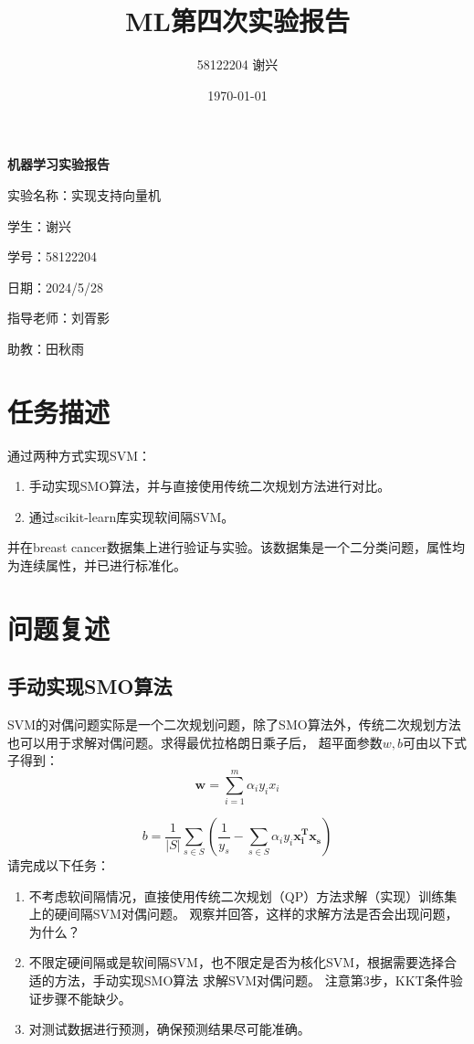 \documentclass[12pt]{article}
\title{\textbf{ML第四次实验报告}}
\author{58122204 谢兴}
\date{\today}
\begin{document}
\begin{titlepage}
  \centering
  \vspace*{60pt}
  \Huge\textbf{机器学习实验报告}

  \vspace{100pt}
  \Large
  实验名称：实现支持向量机

  \vspace{25pt}
  学生：谢兴

  \vspace{25pt}
  学号：58122204

  \vspace{25pt}
  日期：2024/5/28

  \vspace{25pt}
  指导老师：刘胥影

  \vspace{25pt}
  助教：田秋雨



\end{titlepage}


\newpage
\tableofcontents


\section{任务描述}
通过两种方式实现SVM：
\begin{enumerate}
  \item 手动实现SMO算法，并与直接使用传统二次规划方法进行对比。
  \item 通过scikit-learn库实现软间隔SVM。
\end{enumerate}
并在breast cancer数据集上进行验证与实验。该数据集是一个二分类问题，属性均为连续属性，并已进行标准化。


\section{问题复述}
\subsection{手动实现SMO算法}
SVM的对偶问题实际是一个二次规划问题，除了SMO算法外，传统二次规划方法也可以用于求解对偶问题。求得最优拉格朗日乘子后，
超平面参数$w, b$可由以下式子得到：
\begin{equation}
  \textbf{w} = \sum_{i=1}^{m} \alpha_{i}y_{i}x_{i}
\end{equation}

\begin{equation}
  b=\frac{1}{|S|}\sum_{s\in S}(\frac{1}{y_{s}}-\sum_{s\in S}\alpha_{i}y_{i}\mathbf{x_{i}^{T}x_{s}})
\end{equation}
请完成以下任务：
\begin{enumerate}
  \item 不考虑软间隔情况，直接使用传统二次规划（QP）方法求解（实现）训练集上的硬间隔SVM对偶问题。
        观察并回答，这样的求解方法是否会出现问题，为什么？
  \item 不限定硬间隔或是软间隔SVM，也不限定是否为核化SVM，根据需要选择合适的方法，手动实现SMO算法 求解SVM对偶问题。
        注意第3步，KKT条件验证步骤不能缺少。
  \item 对测试数据进行预测，确保预测结果尽可能准确。
\end{enumerate}
\end{document}
